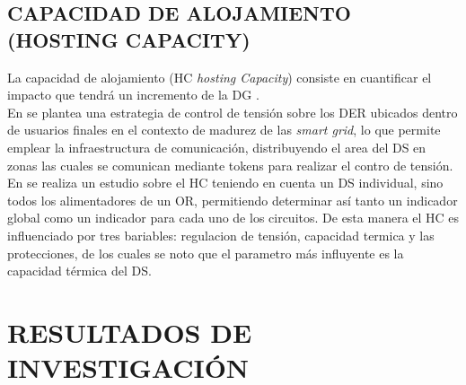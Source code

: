 \documentclass[12pt, letterpaper]{report}
\begin{document}
\section{CAPACIDAD DE ALOJAMIENTO (HOSTING CAPACITY)}	
La capacidad de alojamiento (HC \textit{hosting Capacity}) consiste en cuantificar el impacto que tendrá un incremento de la DG \cite{Bollen2008}.\\
En \cite{Caldon2015a} se plantea una estrategia de control de tensión sobre los DER ubicados dentro  de usuarios finales en el contexto de madurez de las \textit{smart grid}, lo que permite emplear la infraestructura de comunicación, distribuyendo el area del \ac{DS} en zonas las cuales se comunican mediante tokens para realizar el contro de tensión.\\
En \cite{Rylander2016a} se realiza un estudio sobre el HC teniendo en cuenta un \ac{DS} individual,  sino todos los alimentadores de un OR, permitiendo determinar  así tanto un indicador global como un indicador para cada uno de los circuitos.  De esta manera el HC es influenciado por tres bariables: regulacion de tensión, capacidad termica  y las protecciones, de los cuales se noto que el parametro más influyente es la capacidad térmica del \ac{DS}.

\chapter{RESULTADOS DE INVESTIGACIÓN}
\label{cap:resultados}



%
\end{document}
